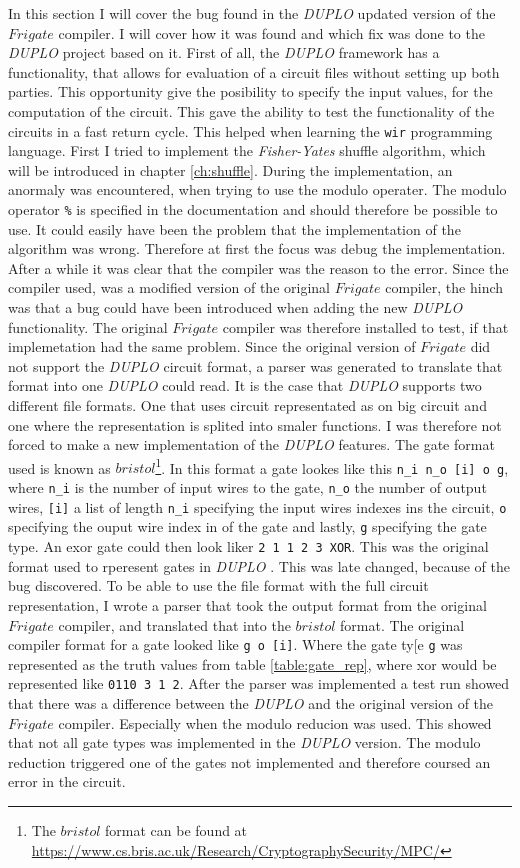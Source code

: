 \documentclass[twoside,11pt,openright]{report}
\newcommand{\FY}{\textit{Fisher-Yates} }
\newcommand{\DUPLO}{\textit{DUPLO} }
\begin{document}
In this section I will cover the bug found in the \DUPLO updated version of the $Frigate$ compiler. I will cover how it was found and which fix was done to the \DUPLO project based on it. First of all, the \DUPLO framework has a functionality, that allows for evaluation of a circuit files without setting up both parties. This opportunity give the posibility to specify the input values, for the computation of the circuit. This gave the ability to test the functionality of the circuits in a fast return cycle. This helped when learning the \verb|wir| programming language. First I tried to implement the \FY shuffle algorithm, which will be introduced in chapter \ref{ch:shuffle}. During the implementation, an anormaly was encountered, when trying to use the modulo operater. The modulo operator \verb|%| is specified in the documentation and should therefore be possible to use. It could easily have been the problem that the implementation of the algorithm was wrong. Therefore at first the focus was debug the implementation. After a while it was clear that the compiler was the reason to the error. Since the compiler used, was a modified version of the original $Frigate$ compiler, the hinch was that a bug could have been introduced when adding the new \DUPLO functionality. The original $Frigate$ compiler was therefore installed to test, if that implemetation had the same problem. Since the original version of $Frigate$ did not support the \DUPLO circuit format, a parser was generated to translate that format into one \DUPLO could read. It is the case that \DUPLO supports two different file formats. One that uses circuit representated as on big circuit and one where the representation is splited into smaler functions. I was therefore not forced to make a new implementation of the \DUPLO features. The gate format used is known as $bristol$\footnote{The $bristol$ format can be found at \newline\url{https://www.cs.bris.ac.uk/Research/CryptographySecurity/MPC/}}. In this format a gate lookes like this \verb|n_i n_o [i] o g|, where \verb|n_i| is the number of input wires to the gate, \verb|n_o| the number of output wires, \verb|[i]| a list of length \verb|n_i| specifying the input wires indexes ins the circuit, \verb|o| specifying the ouput wire index in of the gate and lastly, \verb|g| specifying the gate type. An exor gate could then look liker \verb|2 1 1 2 3 XOR|. This was the original format used to rperesent gates in \DUPLO. This was late changed, because of the bug discovered. To be able to use the file format with the full circuit representation, I wrote a parser that took the output format from the original $Frigate$ compiler, and translated that into the $bristol$ format. The original compiler format for a gate looked like \verb|g o [i]|. Where the gate ty[e \verb|g| was represented as the truth values from table \ref{table:gate_rep}, where xor would be represented like \verb|0110 3 1 2|. After the parser was implemented a test run showed that there was a difference between the \DUPLO and the original version of the $Frigate$ compiler. Especially when the modulo reducion was used. This showed that not all gate types was implemented in the \DUPLO version. The modulo reduction triggered one of the gates not implemented and therefore coursed an error in the circuit.
\end{document}
